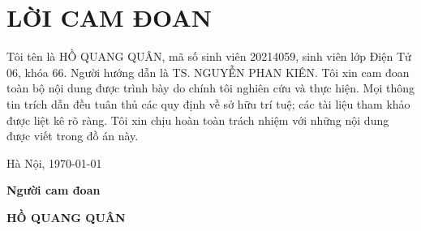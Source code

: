 \section*{LỜI CAM ĐOAN}
\thispagestyle{empty}
Tôi tên là HỒ QUANG QUÂN, mã số sinh viên 20214059, sinh viên lớp Điện Tử 06, khóa 66. Người hướng dẫn là TS. NGUYỄN PHAN KIÊN. Tôi xin cam đoan toàn bộ nội dung được trình bày do chính tôi nghiên cứu và thực hiện. Mọi thông tin trích dẫn đều tuân thủ các quy định về sở hữu trí tuệ; các tài liệu tham khảo được liệt kê rõ ràng. Tôi xin chịu hoàn toàn trách nhiệm với những nội dung được viết trong đồ án này.

\vspace{10pt}
\hspace{8cm}Hà Nội, \today

\hspace{9.25cm}\textbf{Người cam đoan}

\vspace{2cm}
\hspace{9cm}\textbf{HỒ QUANG QUÂN}
\cleardoublepage